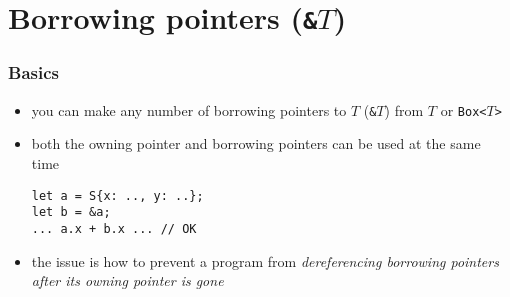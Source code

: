 \documentclass[12pt,dvipdfmx]{beamer}
\newcommand{\aka}[1]{{\color{red}#1}}
\begin{document}
\section{Borrowing pointers ({\tt \&$T$})}
\begin{frame}[fragile]
  \frametitle{Basics}
  \begin{itemize}
  \item you can make any number of borrowing pointers
    to $T$ ({\tt \&$T$}) from $T$ or {\tt Box<$T$>}
  \item both the owning pointer and borrowing pointers can be used
    at the same time
\begin{lstlisting}
let a = S{x: .., y: ..};
let b = &a;
... a.x + b.x ... // OK
\end{lstlisting}
\item the issue is how to prevent a program
  from \aka{\it dereferencing borrowing pointers
    after its owning pointer is gone}
  \end{itemize}
\end{frame}
\end{document}

